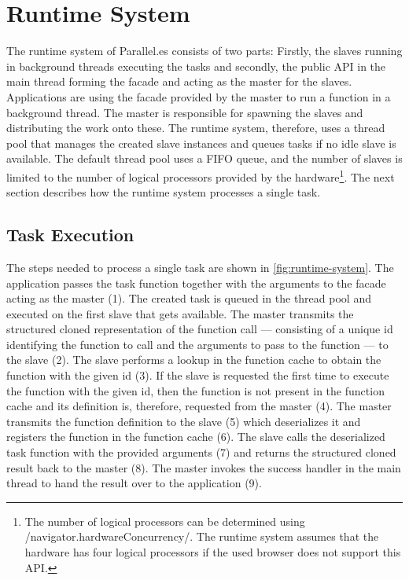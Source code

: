 \section{Runtime System}\label{sec:runtime-system}
The runtime system of Parallel.es consists of two parts: Firstly, the slaves running in background threads executing the tasks and secondly, the public API in the main thread forming the facade and acting as the master for the slaves. Applications are using the facade provided by the master to run a function in a background thread. The master is responsible for spawning the slaves and distributing the work onto these. The runtime system, therefore, uses a thread pool that manages the created slave instances and queues tasks if no idle slave is available. The default thread pool uses a FIFO queue, and the number of slaves is limited to the number of logical processors provided by the hardware\footnote{The number of logical processors can be determined using \javascriptinline/navigator.hardwareConcurrency/. The runtime system assumes that the hardware has four logical processors if the used browser does not support this API.}. The next section describes how the runtime system processes a single task. 

\subsection{Task Execution}
The steps needed to process a single task are shown in \cref{fig:runtime-system}. The application passes the task function together with the arguments to the facade acting as the master (1). The created task is queued in the thread pool and executed on the first slave that gets available. The master transmits the structured cloned representation of the function call --- consisting of a unique id identifying the function to call and the arguments to pass to the function --- to the slave (2). The slave performs a lookup in the function cache to obtain the function with the given id (3). If the slave is requested the first time to execute the function with the given id, then the function is not present in the function cache and its definition is, therefore, requested from the master (4). The master transmits the function definition to the slave (5) which deserializes it and registers the function in the function cache (6). The slave calls the deserialized task function with the provided arguments (7) and returns the structured cloned result back to the master (8). The master invokes the success handler in the main thread to hand the result over to the application (9). 

